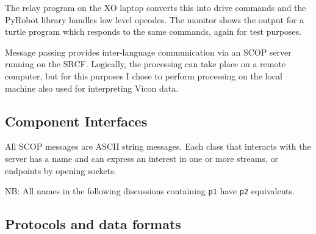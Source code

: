 \documentclass[12pt,a4,notitlepage]{report}
\renewcommand{\_}{\texttt{\symbol{95}}}
\newcommand{\<}{\texttt{\symbol{60}}}
\renewcommand{\>}{\texttt{\symbol{62}}}
\begin{document}
The relay program on the XO laptop converts this into drive commands and the PyRobot library handles low level opcodes. The monitor shows the output for a turtle program which responds to the same commands, again for test purposes.

Message passing provides inter-language communication via an SCOP server running on the SRCF. Logically, the processing can take place on a remote computer, but for this purposes I chose to perform processing on the local machine also used for interpreting Vicon data.

\subsection{Component Interfaces}

All SCOP messages are ASCII string messages. Each class that interacts with the server has a name and can express an interest in one or more streams, or endpoints by opening sockets.

NB: All names in the following discussions containing \verb^p1^ have \verb^p2^ equivalents.

\subsection{Protocols and data formats}
\end{document}
